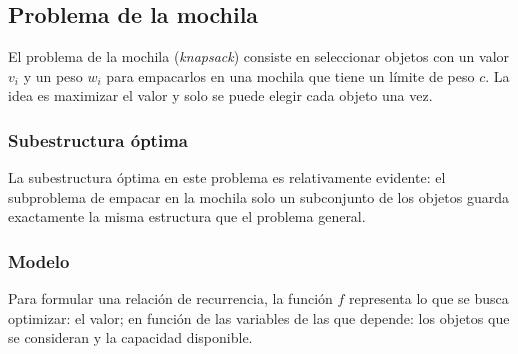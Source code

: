 \subsection{Problema de la mochila}

El problema de la mochila (\textit{knapsack}) consiste en seleccionar objetos con un valor \(v_i\) y un peso \(w_i\) para empacarlos en una mochila que tiene un límite de peso \(c\). La idea es maximizar el valor y solo se puede elegir cada objeto una vez.
\begin{especificacion}
\end{especificacion}

\subsubsection{Subestructura óptima}

La subestructura óptima en este problema es relativamente evidente: el subproblema de empacar en la mochila solo un subconjunto de los objetos guarda exactamente la misma estructura que el problema general.

\subsubsection{Modelo}

Para formular una relación de recurrencia, la función \(f\) representa lo que se busca optimizar: el valor; en función de las variables de las que depende: los objetos que se consideran y la capacidad disponible.

